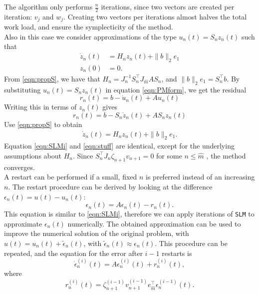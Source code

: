 \noindent The algorithm only performs $\frac{n}{2}$ iterations, since two vectors are created per iteration: $v_j$ and $w_j$. Creating two vectors per iterations almost halves the total work load, and ensure the symplecticity of the method.\\

\noindent Also in this case we consider approximations of the type $u_n(t) = S_n z_n(t)$ such that
\begin{equation*}
\begin{aligned}
\dot{z}_n(t)& = H_n z_n(t) + \|b\|_2 e_1 \\
z_n(0) &= 0.
\end{aligned}
\end{equation*}
From \eqref{eqn:propS}, we have that $H_n = J^{-1}_n S_n^\top J_{\hat{m}} A S_n$, and $ \|b\|_2 e_1 = S_n^\top b $. By substituting $u_n(t) = S_n z_n(t)$ in equation \eqref{eqn:PMform}, we get the residual
\begin{equation*}
r_n(t) = b - \dot{u}_n(t) + Au_n(t)
\end{equation*}
Writing this in terms of $z_n(t)$ gives
\begin{equation*}
r_n(t) = b-S_n \dot{z}_n(t) + AS_nz_n(t)
\end{equation*}
Use \eqref{eqn:propS} to obtain
\begin{equation}
\begin{aligned}
\dot{z}_n(t) = H_n z_n(t) + \|b \|_2 e_1.
\end{aligned}
\label{eqn:SLMi}
\end{equation}
Equation \eqref{eqn:SLMi} and \eqref{eqn:stuff} are identical, except for the underlying assumptions about $H_n$.
\noindent Since $ S_{n}^\top J_{n} \zeta_{n+1} v_{n+1} = 0 $ for some $n \leq \hat{m}$ \cite{SLMconv}, the method converges. \\

\noindent A restart can be performed if a small, fixed $n$ is preferred instead of an increasing $n$. The restart procedure can be derived by looking at the difference $ \epsilon_n(t) = u(t) - u_n(t)$: 
\begin{equation*}
\epsilon_n(t) = A \epsilon_n(t) - r_n(t).
\end{equation*}
This equation is similar to \eqref{eqn:SLMi}, therefore we can apply iterations of \texttt{SLM} to approximate $\epsilon_n(t)$ numerically. The obtained approximation can be used to improve the numerical solution of the original problem, with $u(t) = u_n(t) + \tilde{\epsilon}_n(t)$, with $\tilde{\epsilon}_n(t) \approx \epsilon_n(t)$. This procedure can be repeated, and the equation for the error after $i-1$ restarts is 
\begin{equation*}
\dot{\epsilon}_n^{(i)}(t) = A \epsilon_n^{(i)}(t) + r_n^{(i)}(t),
\end{equation*}
where
\begin{equation*}
r_n^{(i)}(t) = \zeta_{n+1}^{(i-1)} v_{n+1}^{(i-1)} e_{\hat{m}}^\top \epsilon_n^{(i-1)}(t).
\end{equation*}

